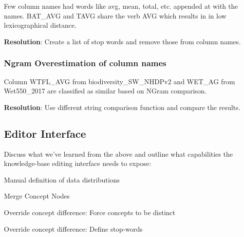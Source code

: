 Few column names had words like avg, mean, total, etc. appended at with the names. BAT\_AVG and TAVG share the verb AVG which results in in low lexicographical distance.

\textbf{Resolution}: Create a list of stop words and remove those from column names.

\subsubsection{Ngram Overestimation of column names}
Column WTFL\_AVG from biodiversity\_SW\_NHDPv2 and WET\_AG from Wet550\_2017 are classified as similar based on NGram comparison. 

\textbf{Resolution}: Use different string comparison function and compare the results.

\subsection{Editor Interface}
Discuss what we've learned from the above and outline what capabilities the knowledge-base editing interface needs to expose:
\begin{enumerate*}
	\item Manual definition of data distributions
	\item Merge Concept Nodes
	\item Override concept difference: Force concepts to be distinct
	\item Override concept difference: Define stop-words
\end{enumerate*}
